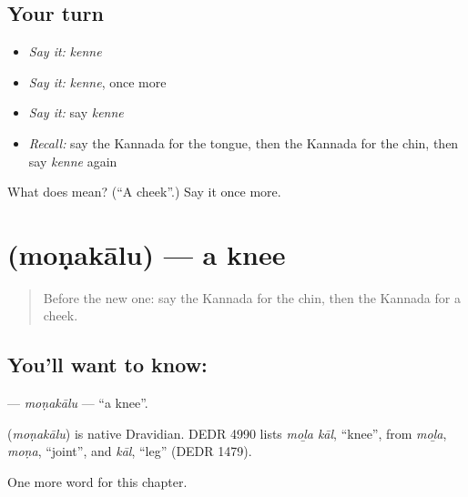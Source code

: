 \subsection*{Your turn}
\begin{itemize}
\raggedright
  \item \emph{Say it:} \emph{kenne}
  \item \emph{Say it:} \emph{kenne}, once more
  \item \emph{Say it:} say \emph{kenne}
  \item \emph{Recall:} say the Kannada for the tongue, then the Kannada for the chin, then say \emph{kenne} again
\end{itemize}

\begin{tcolorbox}[breakable,colback=teal!4,colframe=teal!35!black,title={Before you move on}]
What does  mean? (\textquotedblleft{}A cheek\textquotedblright{}.) Say it once more.
\end{tcolorbox}
\section[\texorpdfstring{\kn{ಮೊಣಕಾಲು} (moṇakālu)}{ಮೊಣಕಾಲು (moṇakālu)}]{ (moṇakālu) — a knee}

\label{lesson:KA-C135-monakalu}



\begin{quote}
Before the new one: say the Kannada for the chin, then the Kannada for a cheek.
\end{quote}

\subsection*{You'll want to know: }
\textbf{} — \emph{moṇakālu} — \textquotedblleft{}a knee\textquotedblright{}.

\begin{cousinweb}
\textbf{} (\emph{moṇakālu}) is native Dravidian. DEDR 4990 lists \emph{moḻa kāl}, \textquotedblleft{}knee\textquotedblright{}, from \emph{moḻa}, \emph{moṇa}, \textquotedblleft{}joint\textquotedblright{}, and \emph{kāl}, \textquotedblleft{}leg\textquotedblright{} (DEDR 1479).
\end{cousinweb}

\begin{grammarlens}[title={What you've built}]
One more word for this chapter.
\end{grammarlens}

